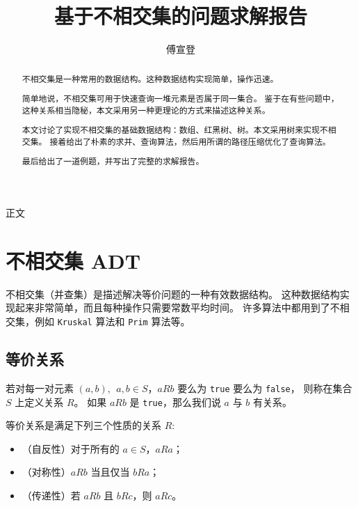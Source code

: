 \documentclass[withoutpreface,bwprint]{cumcmthesis}
\title{基于不相交集的问题求解报告}
\author{傅宣登}
\begin{document}
\maketitle
\begin{abstract}

不相交集是一种常用的数据结构。这种数据结构实现简单，操作迅速。

简单地说，不相交集可用于快速查询一堆元素是否属于同一集合。
鉴于在有些问题中，这种关系相当隐秘，本文采用另一种更理论的方式来描述这种关系。

本文讨论了实现不相交集的基础数据结构：数组、红黑树、树。本文采用树来实现不相交集。
接着给出了朴素的求并、查询算法，然后用所谓的路径压缩优化了查询算法。

最后给出了一道例题，并写出了完整的求解报告。

\end{abstract}

\begin{center}%
	{\heiti 正文 \vspace{-.5em}}%
\end{center}%

\section{不相交集 ADT}

不相交集（并查集）是描述解决等价问题的一种有效数据结构。
这种数据结构实现起来非常简单，而且每种操作只需要常数平均时间。
许多算法中都用到了不相交集，例如 \verb|Kruskal| 算法和 \verb|Prim| 算法等。

\subsection{等价关系}

若对每一对元素 $(a, b),\ \ a,b \in S$，$aRb$ 要么为 \verb|true| 要么为 \verb|false|，
则称在集合 $S$ 上定义关系 $R$。
如果 $aRb$ 是 \verb|true|，那么我们说 $a$ 与 $b$ 有关系。

\begin{definition}[等价关系]
等价关系是满足下列三个性质的关系 $R$:
\begin{itemize}
\item （自反性）对于所有的 $a\in S$，$aRa$；
\item （对称性）$aRb$ 当且仅当 $bRa$；
\item （传递性）若 $aRb$ 且 $bRc$，则 $aRc$。
\end{itemize}
\end{definition}
\end{document}
